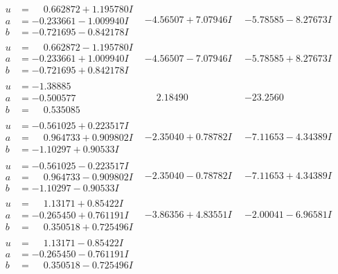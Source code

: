 \documentclass[1p]{elsarticle_modified}
\theoremstyle{definition}
\begin{document}
$$\begin{array}{c|c|c}
\begin{aligned}
u &= \phantom{-}0.662872 + 1.195780 I \\
a &= -0.233661 - 1.009940 I \\
b &= -0.721695 - 0.842178 I\end{aligned}
 & -4.56507 + 7.07946 I & -5.78585 - 8.27673 I \\ \hline\begin{aligned}
u &= \phantom{-}0.662872 - 1.195780 I \\
a &= -0.233661 + 1.009940 I \\
b &= -0.721695 + 0.842178 I\end{aligned}
 & -4.56507 - 7.07946 I & -5.78585 + 8.27673 I \\ \hline\begin{aligned}
u &= -1.38885\phantom{ +0.000000I} \\
a &= -0.500577\phantom{ +0.000000I} \\
b &= \phantom{-}0.535085\phantom{ +0.000000I}\end{aligned}
 & \phantom{-}2.18490\phantom{ +0.000000I} & -23.2560\phantom{ +0.000000I} \\ \hline\begin{aligned}
u &= -0.561025 + 0.223517 I \\
a &= \phantom{-}0.964733 + 0.909802 I \\
b &= -1.10297 + 0.90533 I\end{aligned}
 & -2.35040 + 0.78782 I & -7.11653 - 4.34389 I \\ \hline\begin{aligned}
u &= -0.561025 - 0.223517 I \\
a &= \phantom{-}0.964733 - 0.909802 I \\
b &= -1.10297 - 0.90533 I\end{aligned}
 & -2.35040 - 0.78782 I & -7.11653 + 4.34389 I \\ \hline\begin{aligned}
u &= \phantom{-}1.13171 + 0.85422 I \\
a &= -0.265450 + 0.761191 I \\
b &= \phantom{-}0.350518 + 0.725496 I\end{aligned}
 & -3.86356 + 4.83551 I & -2.00041 - 6.96581 I \\ \hline\begin{aligned}
u &= \phantom{-}1.13171 - 0.85422 I \\
a &= -0.265450 - 0.761191 I \\
b &= \phantom{-}0.350518 - 0.725496 I\end{aligned}

\end{array}$$
\end{document}
